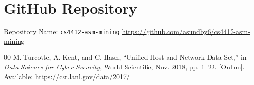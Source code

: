 \documentclass[conference]{IEEEtran}
\begin{document}
\section{GitHub Repository}
Repository Name: \texttt{cs4412-asm-mining}
\url{https://github.com/asundby6/cs4412-asm-mining}

\begin{thebibliography}{00}
M. Turcotte, A. Kent, and C. Hash, ``Unified Host and Network Data Set,'' in \textit{Data Science for Cyber-Security}, World Scientific, Nov. 2018, pp. 1--22. [Online]. Available: \url{https://csr.lanl.gov/data/2017/}
\end{thebibliography}
\end{document}
